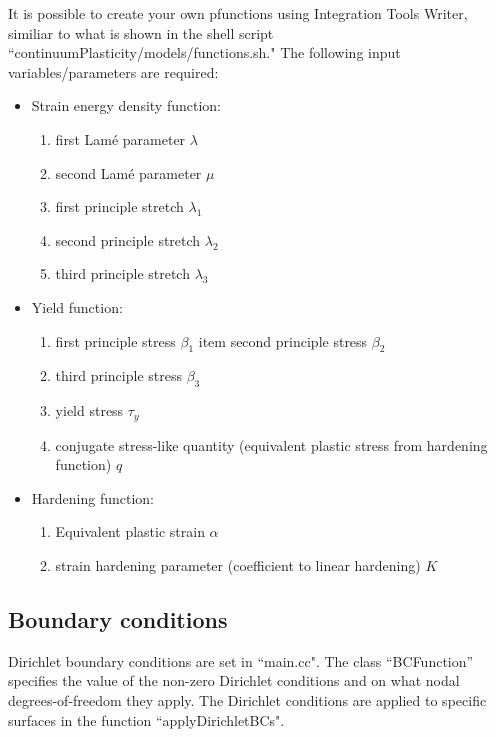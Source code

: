 \documentclass[10pt]{article}
\begin{document}
It is possible to create your own pfunctions using Integration Tools Writer, similiar to what is shown in the shell script ``continuumPlasticity/models/functions.sh." The following input variables/parameters are required:
\begin{itemize}
\itemsep-0.5em
\item Strain energy density function:
\vspace{-3mm}
\begin{enumerate}
\itemsep-0.5em 
\item first Lam\'e parameter $\lambda$
\item second Lam\'e parameter $\mu$
\item first principle stretch $\lambda_1$
\item second principle stretch $\lambda_2$
\item third principle stretch $\lambda_3$
\end{enumerate}
%
\item Yield function: 
\begin{enumerate}
\vspace{-3mm}
\itemsep-0.5em
\item first principle stress $\beta_1$
item second principle stress $\beta_2$
\item third principle stress $\beta_3$
\item yield stress $\tau_y$
\item conjugate stress-like quantity (equivalent plastic stress from hardening function) $q$
\end{enumerate}
%
\item Hardening function: 
\begin{enumerate}
\vspace{-3mm}
\itemsep-0.5em
\item Equivalent plastic strain $\alpha$
\item strain hardening parameter (coefficient to linear hardening) $K$
\end{enumerate}
\end{itemize}

\subsection{Boundary conditions}
Dirichlet boundary conditions are set in ``main.cc". The class ``BCFunction'' specifies the value of the non-zero Dirichlet conditions and on what nodal degrees-of-freedom they apply. The Dirichlet conditions are applied to specific surfaces in the function ``applyDirichletBCs".
\end{document}

